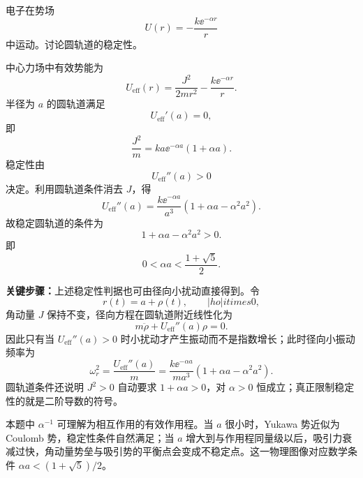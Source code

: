 \begin{question}[圆轨道稳定性]
电子在势场
\[
  U(r)=-\frac{k\ee^{-\alpha r}}{r}
\]
中运动。讨论圆轨道的稳定性。

\begin{solution}
中心力场中有效势能为
\[
  U_{\mathrm{eff}}(r)=\frac{J^2}{2mr^2}-\frac{k\ee^{-\alpha r}}{r}.
\]
半径为 $a$ 的圆轨道满足
\[
  U_{\mathrm{eff}}'(a)=0,
\]
即
\[
  \frac{J^2}{m}=ka\ee^{-\alpha a}(1+\alpha a).
\]
稳定性由
\[
  U_{\mathrm{eff}}''(a)>0
\]
决定。利用圆轨道条件消去 $J$，得
\[
  U_{\mathrm{eff}}''(a)
  =\frac{k\ee^{-\alpha a}}{a^3}\left(1+\alpha a-\alpha^2a^2\right).
\]
故稳定圆轨道的条件为
\[
  1+\alpha a-\alpha^2a^2>0.
\]
即
\[
  \boxed{0<\alpha a<\frac{1+\sqrt5}{2}}.
\]


\medskip
\textbf{关键步骤：}上述稳定性判据也可由径向小扰动直接得到。令
\[
  r(t)=a+\rho(t),\qquad |
ho|
itimes 0,
\]
角动量 $J$ 保持不变，径向方程在圆轨道附近线性化为
\[
  m\ddot\rho+U_{\mathrm{eff}}''(a)\rho=0.
\]
因此只有当 $U_{\mathrm{eff}}''(a)>0$ 时小扰动才产生振动而不是指数增长；此时径向小振动频率为
\[
  \omega_r^2=\frac{U_{\mathrm{eff}}''(a)}{m}
  =\frac{k\ee^{-\alpha a}}{ma^3}\left(1+\alpha a-\alpha^2a^2\right).
\]
圆轨道条件还说明 $J^2>0$ 自动要求 $1+\alpha a>0$，对 $\alpha>0$ 恒成立；真正限制稳定性的就是二阶导数的符号。


\medskip
本题中 $\alpha^{-1}$ 可理解为相互作用的有效作用程。当 $a$ 很小时，Yukawa 势近似为 Coulomb 势，稳定性条件自然满足；当 $a$ 增大到与作用程同量级以后，吸引力衰减过快，角动量势垒与吸引势的平衡点会变成不稳定点。这一物理图像对应数学条件 $\alpha a<(1+\sqrt5)/2$。
\end{solution}
\end{question}

